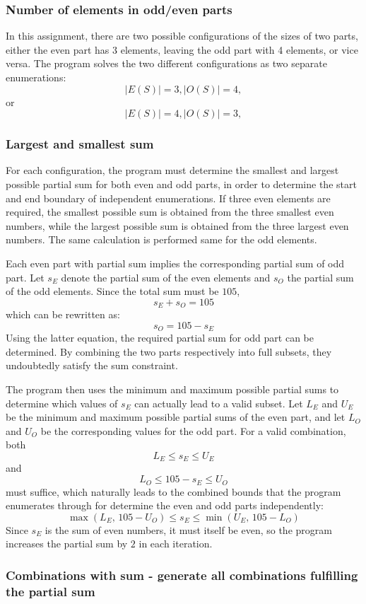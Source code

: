 \documentclass[11pt,a4paper]{article}
\begin{document}
\subsubsection*{Number of elements in odd/even parts}
In this assignment, there are two possible configurations of the sizes of two parts, either the even part has 3 elements, leaving the odd part with 4 elements, or vice versa. The program solves the two different configurations as two separate enumerations:
\[
|E(S)|=3
,
|O(S)|=4,
\]
or
\[
|E(S)|=4
,
|O(S)|=3,
\]

\subsubsection*{Largest and smallest sum}
For each configuration, the program must determine the smallest and largest possible partial sum for both even and odd parts, in order to determine the start and end boundary of independent enumerations. If three even elements are required, the smallest possible sum is obtained from the three smallest even numbers, while the largest possible sum is obtained from the three largest even numbers. The same calculation is performed same for the odd elements. 

Each even part with partial sum implies the corresponding partial sum of odd part. Let $s_E$ denote the partial sum of the even elements and $s_O$ the partial sum of the odd elements. Since the total sum must be $105$,
\[
s_E + s_O = 105
\]
which can be rewritten as:
\[
s_O = 105 - s_E
\]
Using the latter equation, the required partial sum for odd part can be determined. By combining the two parts respectively into full subsets, they undoubtedly satisfy the sum constraint.

The program then uses the minimum and maximum possible partial sums to determine which values of $s_E$ can actually lead to a valid subset. Let $L_E$ and $U_E$ be the minimum and maximum possible partial sums of the even part, and let $L_O$ and $U_O$ be the corresponding values for the odd part. For a valid combination, both
\[
L_E \le s_E \le U_E
\]
and
\[
L_O \le 105 - s_E \le U_O
\]
must suffice, which naturally leads to the combined bounds that the program enumerates through for determine the even and odd parts independently:
\[ \max(L_E,\,105-U_O) \leq s_E \leq \min(U_E,\,105-L_O) \]
Since $s_E$ is the sum of even numbers, it must itself be even, so the program increases the partial sum by $2$ in each iteration.

\subsubsection*{Combinations with sum - generate all combinations fulfilling the partial sum}
\end{document}

